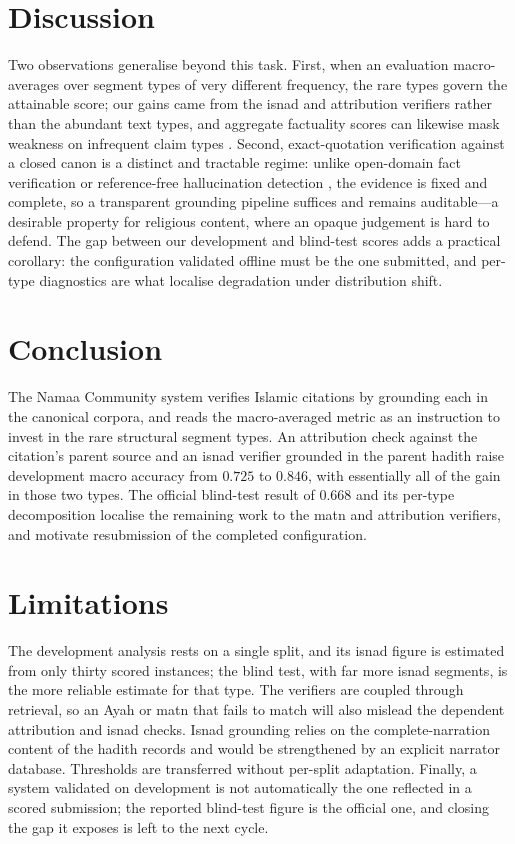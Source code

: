 \documentclass[11pt]{article}
\begin{document}
\section{Discussion}
\label{sec:discussion}
Two observations generalise beyond this task. First, when an evaluation macro-averages over segment
types of very different frequency, the rare types govern the attainable score; our gains came from the
isnad and attribution verifiers rather than the abundant text types, and aggregate factuality scores
can likewise mask weakness on infrequent claim types \citep{min2023factscore}. Second,
exact-quotation verification against a closed canon is a distinct and tractable regime: unlike
open-domain fact verification \citep{thorne2018fever} or reference-free hallucination detection
\citep{manakul2023selfcheckgpt}, the evidence is fixed and complete, so a transparent grounding
pipeline suffices and remains auditable---a desirable property for religious content, where an opaque
judgement is hard to defend. The gap between our development and blind-test scores adds a practical
corollary: the configuration validated offline must be the one submitted, and per-type diagnostics are
what localise degradation under distribution shift.

\section{Conclusion}
The Namaa Community system verifies Islamic citations by grounding each in the canonical corpora, and
reads the macro-averaged metric as an instruction to invest in the rare structural segment types. An
attribution check against the citation's parent source and an isnad verifier grounded in the parent
hadith raise development macro accuracy from $0.725$ to $0.846$, with essentially all of the gain in
those two types. The official blind-test result of $0.668$ and its per-type decomposition localise the
remaining work to the matn and attribution verifiers, and motivate resubmission of the completed
configuration.

\section*{Limitations}
The development analysis rests on a single split, and its isnad figure is estimated from only thirty
scored instances; the blind test, with far more isnad segments, is the more reliable estimate for that
type. The verifiers are coupled through retrieval, so an Ayah or matn that fails to match will also
mislead the dependent attribution and isnad checks. Isnad grounding relies on the complete-narration
content of the hadith records and would be strengthened by an explicit narrator database. Thresholds
are transferred without per-split adaptation. Finally, a system validated on development is not
automatically the one reflected in a scored submission; the reported blind-test figure is the official
one, and closing the gap it exposes is left to the next cycle.
\end{document}

